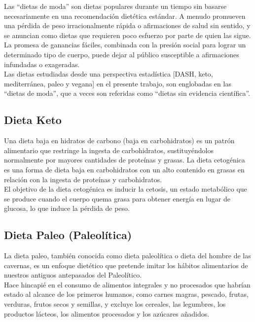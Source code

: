 \documentclass[12pt,a4paper]{article}
\begin{document}
Las ``dietas de moda'' son dietas populares durante un tiempo sin basarse 
necesariamente en una recomendación dietética estándar. A menudo promueven 
una pérdida de peso irracionalmente rápida o afirmaciones de salud sin 
sentido, y se anuncian como dietas que requieren poco esfuerzo por parte de 
quien las sigue. La promesa de ganancias fáciles, combinada con la presión 
social para lograr un determinado tipo de cuerpo, puede dejar al público 
susceptible a afirmaciones infundadas o exageradas.\cite{marvastipopular} \\

Las dietas estudiadas desde una perspectiva estadística	[DASH, keto, mediterránea, 
paleo y vegana] en el presente trabajo, son englobadas en las ``dietas de moda'', que 
a veces son referidas como ``dietas sin evidencia científica''.

\subsection{Dieta Keto}
\cite{marvastipopular} Una dieta baja en hidratos de carbono (baja en 
carbohidratos) es un patrón alimentario que restringe la ingesta de 
carbohidratos, sustituyéndolos normalmente por mayores cantidades de 
proteínas y grasas. La dieta cetogénica es una forma de dieta baja en 
carbohidratos con un alto contenido en grasas en relación con la ingesta 
de proteínas y carbohidratos.\\

El objetivo de la dieta cetogénica es inducir la cetosis, un estado 
metabólico que se produce cuando el cuerpo quema grasa para obtener 
energía en lugar de glucosa, lo que induce la pérdida de peso.

\subsection{Dieta Paleo (Paleolítica)}
\cite{marvastipopular} La dieta paleo, también conocida como dieta 
paleolítica o dieta del hombre de las cavernas, es un enfoque 
dietético que pretende imitar los hábitos alimentarios de nuestros 
antiguos antepasados del Paleolítico. \\

Hace hincapié en el consumo de alimentos integrales y no procesados 
que habrían estado al alcance de los primeros humanos, como carnes magras, 
pescado, frutas, verduras, frutos secos y semillas, y excluye los cereales, 
las legumbres, los productos lácteos, los alimentos procesados y los 
azúcares añadidos.
\end{document}
